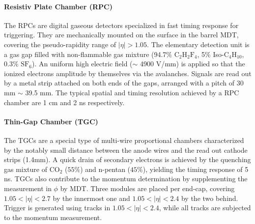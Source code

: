 \paragraph{Resistiv Plate Chamber (RPC)}
The RPCs are digital gaseous detectors specialized in fast timing response for triggering.
They are mechanically mounted on the surface in the barrel MDT, covering the pseudo-rapidity range of $|\eta|>1.05$.
The elementary detection unit is a gas gap filled with non-flammable gas mixture (94.7$\%$ $\mathrm{C_2 H_2 F_4}$, 5$\%$ Iso-$\mathrm{C_4 H_10}$, 0.3$\%$ $\mathrm{SF_6}$). An uniform high electric field ($\sim$ 4900 V/mm) is applied so that the ionized electrons amplitude by themselves via the avalanches. Signals are read out by a metal strip attached on both ends of the gaps, arranged with a pitch of 30 mm $\sim$ 39.5 mm.
The typical spatial and timing resolution achieved by a RPC chamber are 1 cm and 2 ns respectively.



\paragraph{Thin-Gap Chamber (TGC)}
The TGCs are a special type of multi-wire proportional chambers characterized by the notably small distance between the anode wires and the read out cathode strips (1.4mm).
A quick drain of secondary electrons is achieved by the quenching gas mixture of $\mathrm{CO_{2}}$ ($55\%$) and n-pentan ($45\%$), yielding the timing response of 5 ns. TGCs also contribute to the momentum determination by supplementing the measurement in $\phi$ by MDT.
Three modules are placed per end-cap, covering $1.05<|\eta|<2.7$ by the innermost one and $1.05<|\eta|<2.4$ by the two behind. Trigger is generated using tracks in $1.05<|\eta|<2.4$, while all tracks are subjected to the momentum measurement.







\clearpage
